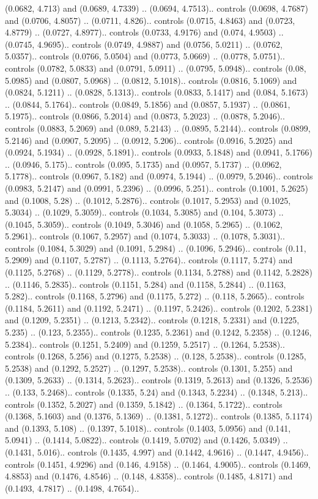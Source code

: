 (0.0682, 4.713) and (0.0689, 4.7339) .. (0.0694, 4.7513).. controls (0.0698, 4.7687) and (0.0706, 4.8057) .. (0.0711, 4.826).. controls (0.0715, 4.8463) and (0.0723, 4.8779) .. (0.0727, 4.8977).. controls (0.0733, 4.9176) and (0.074, 4.9503) .. (0.0745, 4.9695).. controls (0.0749, 4.9887) and (0.0756, 5.0211) .. (0.0762, 5.0357).. controls (0.0766, 5.0504) and (0.0773, 5.0669) .. (0.0778, 5.0751).. controls (0.0782, 5.0833) and (0.0791, 5.0911) .. (0.0795, 5.0948).. controls (0.08, 5.0985) and (0.0807, 5.0968) .. (0.0812, 5.1018).. controls (0.0816, 5.1069) and (0.0824, 5.1211) .. (0.0828, 5.1313).. controls (0.0833, 5.1417) and (0.084, 5.1673) .. (0.0844, 5.1764).. controls (0.0849, 5.1856) and (0.0857, 5.1937) .. (0.0861, 5.1975).. controls (0.0866, 5.2014) and (0.0873, 5.2023) .. (0.0878, 5.2046).. controls (0.0883, 5.2069) and (0.089, 5.2143) .. (0.0895, 5.2144).. controls (0.0899, 5.2146) and (0.0907, 5.2095) .. (0.0912, 5.206).. controls (0.0916, 5.2025) and (0.0924, 5.1934) .. (0.0928, 5.1891).. controls (0.0933, 5.1848) and (0.0941, 5.1766) .. (0.0946, 5.175).. controls (0.095, 5.1735) and (0.0957, 5.1737) .. (0.0962, 5.1778).. controls (0.0967, 5.182) and (0.0974, 5.1944) .. (0.0979, 5.2046).. controls (0.0983, 5.2147) and (0.0991, 5.2396) .. (0.0996, 5.251).. controls (0.1001, 5.2625) and (0.1008, 5.28) .. (0.1012, 5.2876).. controls (0.1017, 5.2953) and (0.1025, 5.3034) .. (0.1029, 5.3059).. controls (0.1034, 5.3085) and (0.104, 5.3073) .. (0.1045, 5.3059).. controls (0.1049, 5.3046) and (0.1058, 5.2965) .. (0.1062, 5.2961).. controls (0.1067, 5.2957) and (0.1074, 5.3033) .. (0.1078, 5.3031).. controls (0.1084, 5.3029) and (0.1091, 5.2984) .. (0.1096, 5.2946).. controls (0.11, 5.2909) and (0.1107, 5.2787) .. (0.1113, 5.2764).. controls (0.1117, 5.274) and (0.1125, 5.2768) .. (0.1129, 5.2778).. controls (0.1134, 5.2788) and (0.1142, 5.2828) .. (0.1146, 5.2835).. controls (0.1151, 5.284) and (0.1158, 5.2844) .. (0.1163, 5.282).. controls (0.1168, 5.2796) and (0.1175, 5.272) .. (0.118, 5.2665).. controls (0.1184, 5.2611) and (0.1192, 5.2471) .. (0.1197, 5.2426).. controls (0.1202, 5.2381) and (0.1209, 5.2351) .. (0.1213, 5.2342).. controls (0.1218, 5.2331) and (0.1225, 5.235) .. (0.123, 5.2355).. controls (0.1235, 5.2361) and (0.1242, 5.2358) .. (0.1246, 5.2384).. controls (0.1251, 5.2409) and (0.1259, 5.2517) .. (0.1264, 5.2538).. controls (0.1268, 5.256) and (0.1275, 5.2538) .. (0.128, 5.2538).. controls (0.1285, 5.2538) and (0.1292, 5.2527) .. (0.1297, 5.2538).. controls (0.1301, 5.255) and (0.1309, 5.2633) .. (0.1314, 5.2623).. controls (0.1319, 5.2613) and (0.1326, 5.2536) .. (0.133, 5.2468).. controls (0.1335, 5.24) and (0.1343, 5.2234) .. (0.1348, 5.213).. controls (0.1352, 5.2027) and (0.1359, 5.1842) .. (0.1364, 5.1722).. controls (0.1368, 5.1603) and (0.1376, 5.1369) .. (0.1381, 5.1272).. controls (0.1385, 5.1174) and (0.1393, 5.108) .. (0.1397, 5.1018).. controls (0.1403, 5.0956) and (0.141, 5.0941) .. (0.1414, 5.0822).. controls (0.1419, 5.0702) and (0.1426, 5.0349) .. (0.1431, 5.016).. controls (0.1435, 4.997) and (0.1442, 4.9616) .. (0.1447, 4.9456).. controls (0.1451, 4.9296) and (0.146, 4.9158) .. (0.1464, 4.9005).. controls (0.1469, 4.8853) and (0.1476, 4.8546) .. (0.148, 4.8358).. controls (0.1485, 4.8171) and (0.1493, 4.7817) .. (0.1498, 4.7654).. 